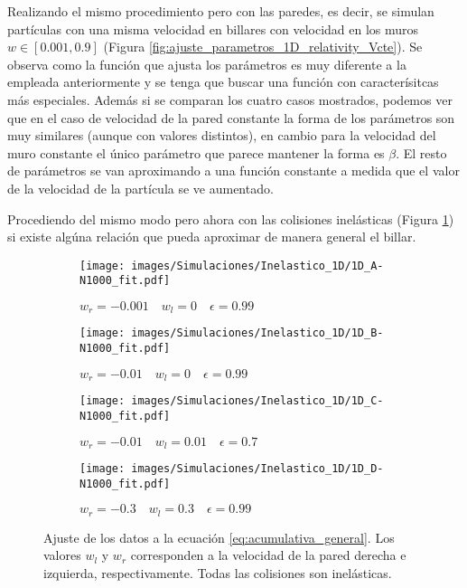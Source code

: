 \documentclass[11pt, spanish]{book}
\begin{document}
Realizando el mismo procedimiento pero con las paredes, es decir, se simulan partículas con una misma velocidad en billares con velocidad en los muros \( w \in [0.001, 0.9] \) (Figura \ref{fig:ajuste_parametros_1D_relativity_Vcte}). Se observa como la función que ajusta los parámetros es muy diferente a la empleada anteriormente y se tenga que buscar una función con caracterísitcas más especiales. Además si se comparan los cuatro casos mostrados, podemos ver que en el caso de velocidad de la pared constante la forma de los parámetros son muy similares (aunque con valores distintos), en cambio para la velocidad del muro constante el único parámetro que parece mantener la forma es \( \beta \). El resto de parámetros se van aproximando a una función constante a medida que el valor de la velocidad de la partícula se ve aumentado.

\vspace{3mm}

Procediendo del mismo modo pero ahora con las colisiones inelásticas (Figura \ref{fig:ajuste_1D_inelastic}) si existe algúna relación que pueda aproximar de manera general el billar. 

\begin{figure}[H]
    \begin{subfigure}[b]{0.5\textwidth}
        \centering
        \texttt{[image: images/Simulaciones/Inelastico\_1D/1D\_A-N1000\_fit.pdf]}
        \caption{$w_r = -0.001 \quad w_l = 0 \quad \epsilon = 0.99$}
    \end{subfigure}
    \hfill
    \begin{subfigure}[b]{0.5\textwidth}
        \centering
        \texttt{[image: images/Simulaciones/Inelastico\_1D/1D\_B-N1000\_fit.pdf]}
        \caption{$w_r = -0.01 \quad w_l = 0 \quad \epsilon = 0.99$}
    \end{subfigure}
    \hfill
    \begin{subfigure}[b]{0.5\textwidth}
        \centering
        \texttt{[image: images/Simulaciones/Inelastico\_1D/1D\_C-N1000\_fit.pdf]}
        \caption{$w_r = -0.01 \quad w_l = 0.01 \quad \epsilon = 0.7$}
    \end{subfigure}
    \hfill
    \begin{subfigure}[b]{0.5\textwidth}
        \centering
        \texttt{[image: images/Simulaciones/Inelastico\_1D/1D\_D-N1000\_fit.pdf]}
        \caption{$w_r = -0.3 \quad w_l = 0.3 \quad \epsilon = 0.99$}
    \end{subfigure}
    \caption{Ajuste de los datos a la ecuación \ref{eq:acumulativa_general}. Los valores \( w_l \) y \( w_r \) corresponden a la velocidad de la pared derecha e izquierda, respectivamente. Todas las colisiones son  inelásticas.}
    \label{fig:ajuste_1D_inelastic}
\end{figure}
\end{document}
